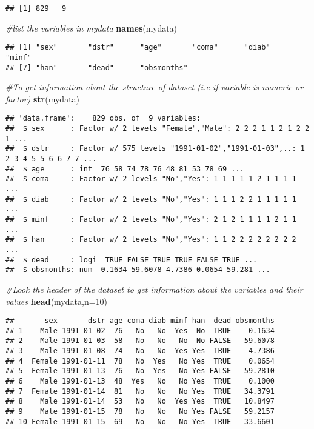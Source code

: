 \documentclass[]{book}
\newenvironment{Shaded}{\begin{snugshade}}{\end{snugshade}}
\newcommand{\KeywordTok}[1]{\textcolor[rgb]{0.13,0.29,0.53}{\textbf{#1}}}
\newcommand{\DataTypeTok}[1]{\textcolor[rgb]{0.13,0.29,0.53}{#1}}
\newcommand{\DecValTok}[1]{\textcolor[rgb]{0.00,0.00,0.81}{#1}}
\newcommand{\CommentTok}[1]{\textcolor[rgb]{0.56,0.35,0.01}{\textit{#1}}}
\newcommand{\NormalTok}[1]{#1}
\theoremstyle{definition}
\theoremstyle{definition}
\theoremstyle{definition}
\theoremstyle{remark}
\begin{document}
\begin{verbatim}
## [1] 829   9
\end{verbatim}

\begin{Shaded}
\begin{Highlighting}[]
\CommentTok{#list the variables in mydata}
\KeywordTok{names}\NormalTok{(mydata)}
\end{Highlighting}
\end{Shaded}

\begin{verbatim}
## [1] "sex"       "dstr"      "age"       "coma"      "diab"      "minf"     
## [7] "han"       "dead"      "obsmonths"
\end{verbatim}

\begin{Shaded}
\begin{Highlighting}[]
\CommentTok{#To get information about the structure of dataset (i.e if variable is numeric or factor)}
\KeywordTok{str}\NormalTok{(mydata)}
\end{Highlighting}
\end{Shaded}

\begin{verbatim}
## 'data.frame':    829 obs. of  9 variables:
##  $ sex      : Factor w/ 2 levels "Female","Male": 2 2 2 1 1 2 1 2 2 1 ...
##  $ dstr     : Factor w/ 575 levels "1991-01-02","1991-01-03",..: 1 2 3 4 5 5 6 6 7 7 ...
##  $ age      : int  76 58 74 78 76 48 81 53 78 69 ...
##  $ coma     : Factor w/ 2 levels "No","Yes": 1 1 1 1 1 2 1 1 1 1 ...
##  $ diab     : Factor w/ 2 levels "No","Yes": 1 1 1 2 2 1 1 1 1 1 ...
##  $ minf     : Factor w/ 2 levels "No","Yes": 2 1 2 1 1 1 1 2 1 1 ...
##  $ han      : Factor w/ 2 levels "No","Yes": 1 1 2 2 2 2 2 2 2 2 ...
##  $ dead     : logi  TRUE FALSE TRUE TRUE FALSE TRUE ...
##  $ obsmonths: num  0.1634 59.6078 4.7386 0.0654 59.281 ...
\end{verbatim}

\begin{Shaded}
\begin{Highlighting}[]
\CommentTok{#Look the header of the dataset to get information about the variables and their values}
\KeywordTok{head}\NormalTok{(mydata,}\DataTypeTok{n=}\DecValTok{10}\NormalTok{)}
\end{Highlighting}
\end{Shaded}

\begin{verbatim}
##       sex       dstr age coma diab minf han  dead obsmonths
## 1    Male 1991-01-02  76   No   No  Yes  No  TRUE    0.1634
## 2    Male 1991-01-03  58   No   No   No  No FALSE   59.6078
## 3    Male 1991-01-08  74   No   No  Yes Yes  TRUE    4.7386
## 4  Female 1991-01-11  78   No  Yes   No Yes  TRUE    0.0654
## 5  Female 1991-01-13  76   No  Yes   No Yes FALSE   59.2810
## 6    Male 1991-01-13  48  Yes   No   No Yes  TRUE    0.1000
## 7  Female 1991-01-14  81   No   No   No Yes  TRUE   34.3791
## 8    Male 1991-01-14  53   No   No  Yes Yes  TRUE   10.8497
## 9    Male 1991-01-15  78   No   No   No Yes FALSE   59.2157
## 10 Female 1991-01-15  69   No   No   No Yes  TRUE   33.6601
\end{verbatim}
\end{document}
